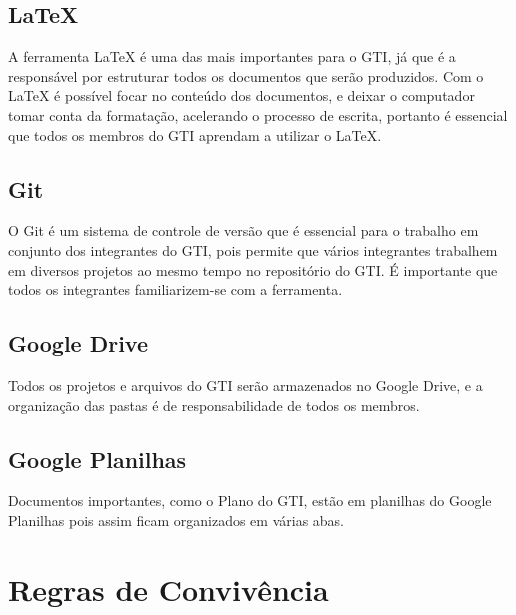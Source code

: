 \documentclass{article}
\begin{document}
\subsection{LaTeX}
A ferramenta LaTeX é uma das mais importantes para o GTI, já que é a responsável por estruturar todos os documentos que serão produzidos. Com o LaTeX é possível focar no conteúdo dos documentos, e deixar o computador tomar conta da formatação, acelerando o processo de escrita, portanto é essencial que todos os membros do GTI aprendam a utilizar o LaTeX.

\subsection{Git}
O Git é um sistema de controle de versão que é essencial para o trabalho em conjunto dos integrantes do GTI, pois permite que vários integrantes trabalhem em diversos projetos ao mesmo tempo no repositório do GTI. É importante que todos os integrantes familiarizem-se com a ferramenta.

\subsection{Google Drive}
Todos os projetos e arquivos do GTI serão armazenados no Google Drive, e a organização das pastas é de responsabilidade de todos os membros.

\subsection{Google Planilhas}
Documentos importantes, como o Plano do GTI, estão em planilhas do Google Planilhas pois assim ficam organizados em várias abas.

\section{Regras de Convivência}
\end{document}
